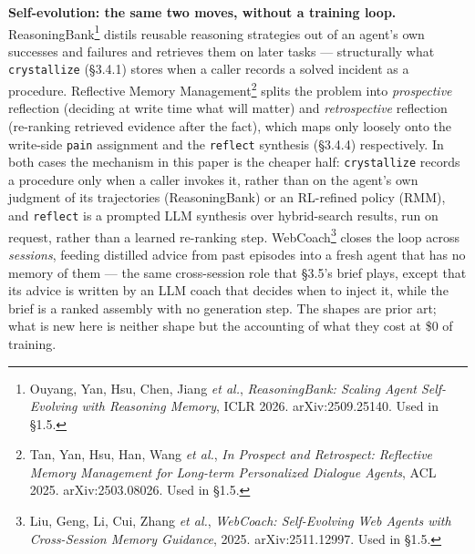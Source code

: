 \documentclass[
]{article}
\begin{document}
\textbf{Self-evolution: the same two moves, without a training loop.}
ReasoningBank\footnote{Ouyang, Yan, Hsu, Chen, Jiang \emph{et al.},
  \emph{ReasoningBank: Scaling Agent Self-Evolving with Reasoning
  Memory}, ICLR 2026. arXiv:2509.25140. Used in §1.5.} distils reusable
reasoning strategies out of an agent's own successes and failures and
retrieves them on later tasks --- structurally what \texttt{crystallize}
(§3.4.1) stores when a caller records a solved incident as a procedure.
Reflective Memory Management\footnote{Tan, Yan, Hsu, Han, Wang \emph{et
  al.}, \emph{In Prospect and Retrospect: Reflective Memory Management
  for Long-term Personalized Dialogue Agents}, ACL 2025.
  arXiv:2503.08026. Used in §1.5.} splits the problem into
\emph{prospective} reflection (deciding at write time what will matter)
and \emph{retrospective} reflection (re-ranking retrieved evidence after
the fact), which maps only loosely onto the write-side \texttt{pain}
assignment and the \texttt{reflect} synthesis (§3.4.4) respectively. In
both cases the mechanism in this paper is the cheaper half:
\texttt{crystallize} records a procedure only when a caller invokes it,
rather than on the agent's own judgment of its trajectories
(ReasoningBank) or an RL-refined policy (RMM), and \texttt{reflect} is a
prompted LLM synthesis over hybrid-search results, run on request,
rather than a learned re-ranking step. WebCoach\footnote{Liu, Geng, Li,
  Cui, Zhang \emph{et al.}, \emph{WebCoach: Self-Evolving Web Agents
  with Cross-Session Memory Guidance}, 2025. arXiv:2511.12997. Used in
  §1.5.} closes the loop across \emph{sessions}, feeding distilled
advice from past episodes into a fresh agent that has no memory of them
--- the same cross-session role that §3.5's brief plays, except that its
advice is written by an LLM coach that decides when to inject it, while
the brief is a ranked assembly with no generation step. The shapes are
prior art; what is new here is neither shape but the accounting of what
they cost at \$0 of training.
\end{document}
